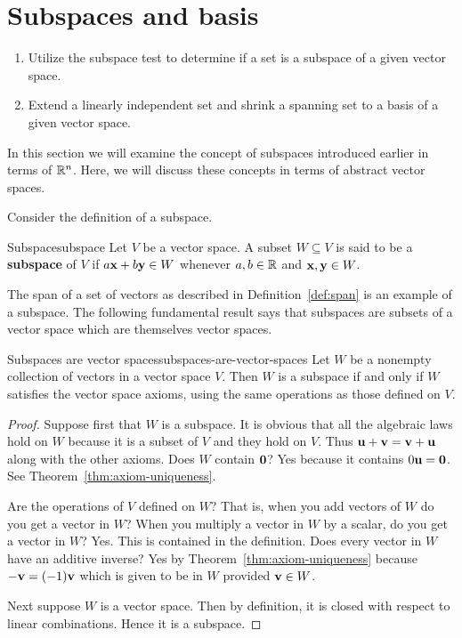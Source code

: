 \section{Subspaces and basis}

\begin{outcome}
  \begin{enumerate}
  \item Utilize the subspace test to determine if a set is a subspace
    of a given vector space.
  \item Extend a linearly independent set and shrink a spanning set to
    a basis of a given vector space.
  \end{enumerate}
\end{outcome}

In this section we will examine the concept of subspaces introduced earlier in terms of $\mathbb{R}^n$. Here, we will discuss these concepts in terms of abstract vector spaces.

Consider the definition of a subspace.

\begin{definition}{Subspace}{subspace}
Let $V$ be a vector space. A subset $W\subseteq V$ is said to be a \textbf{subspace} of $V$ if $a\mbox{\bf x}+b\mbox{\bf y}
\in W$ whenever $a,b\in \mathbb{R}$ and $\mbox{\bf x},\mbox{\bf y}\in W$.
\end{definition}

The span of a set of vectors as described in Definition~\ref{def:span} is an example of a subspace. The following fundamental result says that subspaces are subsets of a
vector space which are themselves vector spaces.

\begin{theorem}{Subspaces are vector spaces}{subspaces-are-vector-spaces}
Let $W$ be a nonempty collection of vectors in a vector space $V$. Then $W$
is a subspace if and only if $W$ satisfies the vector space axioms, using the same
operations as those defined on $V$.
\end{theorem}

\begin{proof}
Suppose first that $W$ is a subspace. It is obvious that
all the algebraic laws hold on $W$ because it is a subset of $V$ and they
hold on $V$. Thus $\mbox{\bf u}+\mbox{\bf v}=\mbox{\bf v}+\mbox{\bf u}$ along with the other axioms. Does $W$
contain $\mbox{\bf 0}$? Yes because it contains $0\mbox{\bf u}=\mbox{\bf 0}$. See
Theorem~\ref{thm:axiom-uniqueness}.

 Are the operations of $V$ defined on $W$? That is,
when you add vectors of $W$ do you get a vector in $W$? When you multiply a
vector in $W$ by a scalar, do you get a vector in $W$? Yes. This is
contained in the definition. Does every vector in $W$ have an additive
inverse? Yes by Theorem~\ref{thm:axiom-uniqueness} because $-\mbox{\bf v}=(
-1) \mbox{\bf v}$ which is given to be in $W$ provided $\mbox{\bf v}\in W$.

Next suppose $W$ is a vector space. Then by definition, it is closed with
respect to linear combinations. Hence it is a subspace.
\end{proof}

